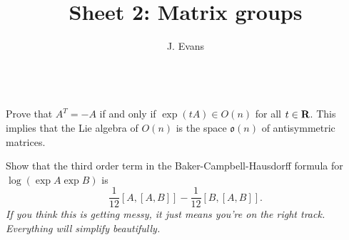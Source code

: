 \documentclass[12pt]{article}
\title{Sheet 2: Matrix groups}
\author{J. Evans}
\date{}
\begin{document}
\maketitle


\begin{question}\ \\
Prove that $A^T=-A$ if and only if $\exp(tA)\in O(n)$ for all $t\in\mathbf{R}$. This implies that the Lie algebra of $O(n)$ is the space $\mathfrak{o}(n)$ of antisymmetric matrices.
\end{question}

\iffalse
\begin{answer}
If $A^T=-A$ then $(\exp(tA))^T=\left(\sum_{n=0}^{\infty}\frac{1}{n!}A^n\right)^T=\sum_{n=0}^{\infty}\frac{1}{n!}(A^T)^n=\sum_{n=0}^{\infty}\frac{1}{n!}(-1)^nA^n=\exp(-tA)$ hence $\exp(tA)\left(\exp(tA)\right)^T=1$ and $\exp(tA)\in O(n)$.

Conversely if $\exp(tA)\left(\exp(tA)\right)^T=1$ for all $t$ then differentiating with respect to $t$ at $t=0$ we get
\[A+A^T=0\]
and hence $A^T=-A$.
\end{answer}
\newpage
\fi

\bigskip

\begin{question}
Show that the third order term in the Baker-Campbell-Hausdorff formula for $\log(\exp A\exp B)$ is
\[\frac{1}{12}[A,[A,B]]-\frac{1}{12}[B,[A,B]].\]
{\em If you think this is getting messy, it just means you're on the right track. Everything will simplify beautifully.}
\end{question}

\iffalse
\begin{answer}
Let
\[e^Ae^B-1=X=\left(1+A+A^2/2+A^3/3!+\cdots\right)\left(1+B+B^2/2+B^3/3!+\cdots\right)-1\]
and compute
\[\log(e^Ae^B)=\log(1+X)=X-X^2/2+X^3/3+\cdots\]
to third order. Thereafter, good luck. Be careful to note that $A$ and $B$ do not commute.
\end{answer}
\newpage
\fi

\bigskip
\end{document}
